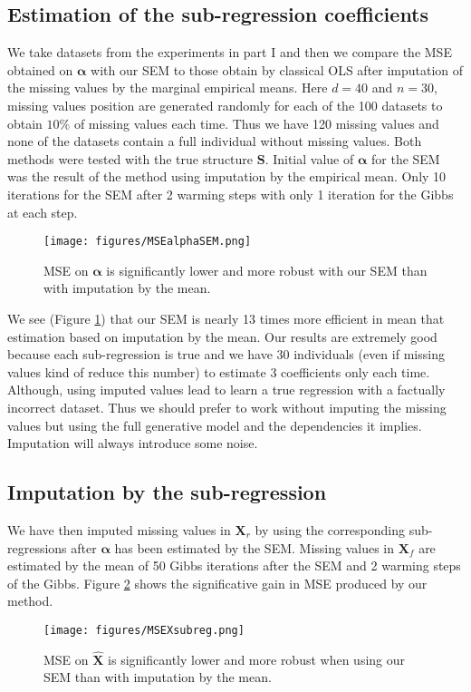\documentclass[12pt,a4paper]{report}
\begin{document}
		\subsection{Estimation of the sub-regression coefficients}
			We take datasets from the experiments in part I and then we compare the MSE obtained on $\boldsymbol{\alpha}$ with our SEM to those obtain by classical OLS after imputation of the missing values by the marginal empirical means. Here $d=40$ and $n=30$, missing values position are generated randomly for each of the 100 datasets to obtain $10 \%$ of missing values each time. Thus we have 120 missing values and none of the datasets contain a full individual without missing values.
Both methods were tested with the true structure $\boldsymbol{S}$. Initial value of $\boldsymbol{\alpha}$ for the SEM was the result of the method using imputation by the empirical mean. Only 10 iterations for the SEM after 2 warming steps with only 1 iteration for the Gibbs at each step.

\begin{figure}[h!]
	\centering
	\texttt{[image: figures/MSEalphaSEM.png]} 
	\caption{MSE on $\boldsymbol{\alpha}$ is significantly lower and more robust with our SEM than with imputation by the mean.}\label{MSEalphaSEM}
\end{figure}

	We see (Figure \ref{MSEalphaSEM}) that our SEM is nearly 13 times more efficient in mean that estimation based on imputation by the mean. Our results are extremely good because each sub-regression is true and we have 30 individuals (even if missing values kind of reduce this number) to estimate 3 coefficients only each time. Although, using imputed values lead to learn a true regression with a factually incorrect dataset. Thus we should prefer to work without imputing the missing values but using the full generative model and the dependencies it implies. Imputation will always introduce some noise.

		
			\subsection{Imputation by the sub-regression}
			We have then imputed missing values in $\boldsymbol{X}_r$  by using the corresponding sub-regressions after $\boldsymbol{\alpha}$ has been estimated  by the SEM.
			Missing values in $\boldsymbol{X}_f$ are estimated by the mean of 50 Gibbs iterations after the SEM and 2 warming steps of the Gibbs. Figure \ref{MSEXsubreg} shows the significative gain in MSE produced by our method.
			\begin{figure}[h!]
	\centering
	\texttt{[image: figures/MSEXsubreg.png]} 
	\caption{MSE on $\hat{\boldsymbol{X}}$ is significantly lower and more robust when using our SEM than with imputation by the mean.}\label{MSEXsubreg}
\end{figure}
\FloatBarrier
\end{document}
